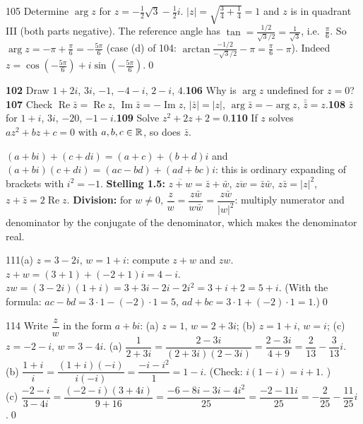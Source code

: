 \begin{bookex}{105}
Determine $\arg z$ for $z=-\frac12\sqrt3-\frac12i$.
\solution
$|z|=\sqrt{\frac34+\frac14}=1$ and $z$ is in quadrant III (both parts negative). The reference angle has $\tan=\frac{1/2}{\sqrt3/2}=\frac1{\sqrt3}$, i.e.\ $\frac\pi6$. So $\arg z=-\pi+\frac\pi6=-\frac{5\pi}6$ (case (d) of 104: $\arctan\frac{-1/2}{-\sqrt3/2}-\pi=\frac\pi6-\pi$). Indeed $z=\cos(-\frac{5\pi}6)+i\sin(-\frac{5\pi}6)$.\qed
\end{bookex}

\begin{trybox}[{102, 106, 107, 108, 109, 110}]
\textbf{102} Draw $1+2i$, $3i$, $-1$, $-4-i$, $2-i$, $4$.\quad \textbf{106} Why is $\arg z$ undefined for $z=0$?\quad \textbf{107} Check $\operatorname{Re}\bar z=\operatorname{Re}z$, $\operatorname{Im}\bar z=-\operatorname{Im}z$, $|\bar z|=|z|$, $\arg\bar z=-\arg z$, $\bar{\bar z}=z$.\quad \textbf{108} $\bar z$ for $1+i$, $3i$, $-20$, $-1-i$.\quad \textbf{109} Solve $z^2+2z+2=0$.\quad \textbf{110} If $z$ solves $az^2+bz+c=0$ with $a,b,c\in\mathbb{R}$, so does $\bar z$.
\end{trybox}

\begin{key}
$(a+bi)+(c+di)=(a+c)+(b+d)i$ and $(a+bi)(c+di)=(ac-bd)+(ad+bc)i$: this is ordinary expanding of brackets with $i^2=-1$. \textbf{Stelling 1.5:} $\overline{z+w}=\bar z+\bar w$, $\overline{zw}=\bar z\bar w$, $z\bar z=|z|^2$, $z+\bar z=2\operatorname{Re}z$. \textbf{Division:} for $w\ne0$, $\dfrac zw=\dfrac{z\bar w}{w\bar w}=\dfrac{z\bar w}{|w|^2}$: multiply numerator and denominator by the conjugate of the denominator, which makes the denominator real.
\end{key}

\begin{bookex}{111(a)}
$z=3-2i$, $w=1+i$: compute $z+w$ and $zw$.
\solution
$z+w=(3+1)+(-2+1)i=4-i$.\quad $zw=(3-2i)(1+i)=3+3i-2i-2i^2=3+i+2=5+i$. (With the formula: $ac-bd=3\cdot1-(-2)\cdot1=5$, $ad+bc=3\cdot1+(-2)\cdot1=1$.)\qed
\end{bookex}

\begin{bookex}{114}
Write $\dfrac zw$ in the form $a+bi$: (a) $z=1$, $w=2+3i$; (b) $z=1+i$, $w=i$; (c) $z=-2-i$, $w=3-4i$.
\solution
(a) $\dfrac1{2+3i}=\dfrac{2-3i}{(2+3i)(2-3i)}=\dfrac{2-3i}{4+9}=\dfrac2{13}-\dfrac3{13}i$.\\
(b) $\dfrac{1+i}i=\dfrac{(1+i)(-i)}{i(-i)}=\dfrac{-i-i^2}{1}=1-i$. (Check: $i(1-i)=i+1$. \checkmark)\\
(c) $\dfrac{-2-i}{3-4i}=\dfrac{(-2-i)(3+4i)}{9+16}=\dfrac{-6-8i-3i-4i^2}{25}=\dfrac{-2-11i}{25}=-\dfrac2{25}-\dfrac{11}{25}i$.\qed
\end{bookex}

